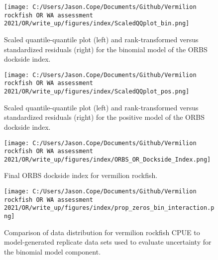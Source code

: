 \documentclass[11pt,
  english,
  a4paper,
]{article}
\begin{document}
\begin{figure}
\centering
\texttt{[image: C:/Users/Jason.Cope/Documents/Github/Vermilion rockfish OR WA assessment 2021/OR/write\_up/figures/index/ScaledQQplot\_bin.png]}
\caption{Scaled quantile-quantile plot (left) and rank-transformed versus standardized residuals (right) for the binomial model of the ORBS dockside index.\label{fig:ScaledQQplot-bin}}
\end{figure}

\tagmcend\tagstructend


\begin{figure}
\centering
\texttt{[image: C:/Users/Jason.Cope/Documents/Github/Vermilion rockfish OR WA assessment 2021/OR/write\_up/figures/index/ScaledQQplot\_pos.png]}
\caption{Scaled quantile-quantile plot (left) and rank-transformed versus standardized residuals (right) for the positive model of the ORBS dockside index.\label{fig:ScaledQQplot-pos}}
\end{figure}

\tagmcend\tagstructend


\begin{figure}
\centering
\texttt{[image: C:/Users/Jason.Cope/Documents/Github/Vermilion rockfish OR WA assessment 2021/OR/write\_up/figures/index/ORBS\_OR\_Dockside\_Index.png]}
\caption{Final ORBS dockside index for vermilion rockfish.\label{fig:ORBS-OR-Dockside-Index}}
\end{figure}

\tagmcend\tagstructend


\begin{figure}
\centering
\texttt{[image: C:/Users/Jason.Cope/Documents/Github/Vermilion rockfish OR WA assessment 2021/OR/write\_up/figures/index/prop\_zeros\_bin\_interaction.png]}
\caption{Comparison of data distribution for vermilion rockfish CPUE to model-generated replicate data sets used to evaluate uncertainty for the binomial model component.\label{fig:prop-zeros-bin-interaction}}
\end{figure}
\end{document}
